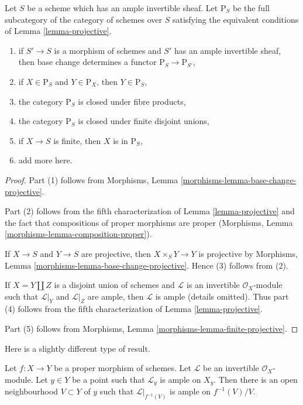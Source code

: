 \begin{lemma}
\label{lemma-category-projective}
Let $S$ be a scheme which has an ample invertible sheaf.
Let $\text{P}_S$ be the full subcategory of the
category of schemes over $S$ satisfying the equivalent
conditions of Lemma \ref{lemma-projective}.
\begin{enumerate}
\item if $S' \to S$ is a morphism of schemes and $S'$ has
an ample invertible sheaf, then base change determines
a functor $\text{P}_S \to \text{P}_{S'}$,
\item if $X \in \text{P}_S$ and $Y \in \text{P}_X$, then $Y \in \text{P}_S$,
\item the category $\text{P}_S$ is closed under fibre products,
\item the category $\text{P}_S$ is closed under
finite disjoint unions,
\item if $X \to S$ is finite, then $X$ is in $\text{P}_S$,
\item add more here.
\end{enumerate}
\end{lemma}

\begin{proof}
Part (1) follows from Morphisms, Lemma
\ref{morphisms-lemma-base-change-projective}.

\medskip\noindent
Part (2) follows from the fifth characterization of
Lemma \ref{lemma-projective} and the fact that compositions
of proper morphisms are proper
(Morphisms, Lemma \ref{morphisms-lemma-composition-proper}).

\medskip\noindent
If $X \to S$ and $Y \to S$ are projective, then
$X \times_S Y \to Y$ is projective by
Morphisms, Lemma \ref{morphisms-lemma-base-change-projective}.
Hence (3) follows from (2).

\medskip\noindent
If $X = Y \amalg Z$ is a disjoint union of schemes
and $\mathcal{L}$ is an invertible $\mathcal{O}_X$-module
such that $\mathcal{L}|_Y$ and $\mathcal{L}|_Z$ are ample, then
$\mathcal{L}$ is ample (details omitted). Thus
part (4) follows from the fifth characterization of
Lemma \ref{lemma-projective}.

\medskip\noindent
Part (5) follows from
Morphisms, Lemma \ref{morphisms-lemma-finite-projective}.
\end{proof}

\noindent
Here is a slightly different type of result.

\begin{lemma}
\label{lemma-ample-in-neighbourhood}
\begin{reference}
\cite[IV Corollary 9.6.4]{EGA}
\end{reference}
Let $f : X \to Y$ be a proper morphism of schemes.
Let $\mathcal{L}$ be an invertible $\mathcal{O}_X$-module.
Let $y \in Y$ be a point such that $\mathcal{L}_y$ is ample
on $X_y$. Then there is an open neighbourhood $V \subset Y$
of $y$ such that $\mathcal{L}|_{f^{-1}(V)}$ is ample on $f^{-1}(V)/V$.
\end{lemma}

